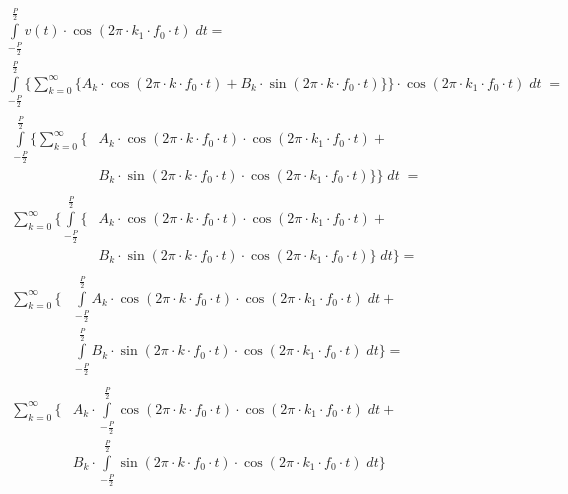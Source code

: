 \documentclass[11pt,a4paper]{article}
\begin{document}
\begin{gather}
\int\limits_{-\frac{P}{2}}^{\frac{P}{2}}v(t)\cdot\cos(2\pi\cdot{}k_{1}\cdot{}f_{0}\cdot{}t)\;dt = \nonumber\\
%
\int\limits_{-\frac{P}{2}}^{\frac{P}{2}}\Bigg\lbrace\sum_{k=0}^{\infty} \big\lbrace{}A_{k}\cdot\cos(2\pi\cdot{}k\cdot{}f_{0}\cdot{}t)+B_{k}\cdot\sin(2\pi\cdot{}k\cdot{}f_{0}\cdot{}t)\big\rbrace\Bigg\rbrace\cdot\cos(2\pi\cdot{}k_{1}\cdot{}f_{0}\cdot{}t)\;dt\;=\nonumber\\
%
\begin{split}
\int\limits_{-\frac{P}{2}}^{\frac{P}{2}}\Bigg\lbrace\sum_{k=0}^{\infty} \big\lbrace&A_{k}\cdot\cos(2\pi\cdot{}k\cdot{}f_{0}\cdot{}t)\cdot\cos(2\pi\cdot{}k_{1}\cdot{}f_{0}\cdot{}t)+\\
&B_{k}\cdot\sin(2\pi\cdot{}k\cdot{}f_{0}\cdot{}t)\cdot\cos(2\pi\cdot{}k_{1}\cdot{}f_{0}\cdot{}t)\big\rbrace\Bigg\rbrace\;dt\;=
\end{split}\nonumber\\
%
\begin{split}
\sum_{k=0}^{\infty}\Bigg\lbrace\int\limits_{-\frac{P}{2}}^{\frac{P}{2}}\Big\lbrace{}&A_{k}\cdot\cos(2\pi\cdot{}k\cdot{}f_{0}\cdot{}t)\cdot\cos(2\pi\cdot{}k_{1}\cdot{}f_{0}\cdot{}t)+\\
&{}B_{k}\cdot\sin(2\pi\cdot{}k\cdot{}f_{0}\cdot{}t)\cdot\cos(2\pi\cdot{}k_{1}\cdot{}f_{0}\cdot{}t)\Big\rbrace\;dt\Bigg\rbrace{}=
\end{split}\nonumber\\
%
\begin{split}
\sum_{k=0}^{\infty}\Bigg\lbrace
&\int\limits_{-\frac{P}{2}}^{\frac{P}{2}}A_{k}\cdot\cos(2\pi\cdot{}k\cdot{}f_{0}\cdot{}t)\cdot\cos(2\pi\cdot{}k_{1}\cdot{}f_{0}\cdot{}t)\;dt + \\
&\int\limits_{-\frac{P}{2}}^{\frac{P}{2}}B_{k}\cdot\sin(2\pi\cdot{}k\cdot{}f_{0}\cdot{}t)\cdot\cos(2\pi\cdot{}k_{1}\cdot{}f_{0}\cdot{}t)\;dt
\Bigg\rbrace{}=
\end{split}\nonumber\\
%
\begin{split}
\sum_{k=0}^{\infty}\Bigg\lbrace
&A_{k}\cdot\int\limits_{-\frac{P}{2}}^{\frac{P}{2}}\cos(2\pi\cdot{}k\cdot{}f_{0}\cdot{}t)\cdot\cos(2\pi\cdot{}k_{1}\cdot{}f_{0}\cdot{}t)\;dt + \\
&B_{k}\cdot\int\limits_{-\frac{P}{2}}^{\frac{P}{2}}\sin(2\pi\cdot{}k\cdot{}f_{0}\cdot{}t)\cdot\cos(2\pi\cdot{}k_{1}\cdot{}f_{0}\cdot{}t)\;dt
\Bigg\rbrace
\end{split}
\end{gather}
\end{document}
